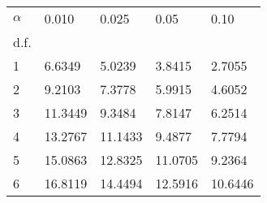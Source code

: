 \documentclass{standalone}
\begin{document}
\begin{tabular}{lllll}
\toprule
$\alpha$ &                       0.010 &                       0.025 &                       0.05 &                       0.10 \\
d.f. &                             &                             &                             &                             \\
\midrule
1    &                      6.6349 &                      5.0239 &                      3.8415 &                      2.7055 \\
2    &   \cellcolor{gray!20}9.2103 &   \cellcolor{gray!20}7.3778 &   \cellcolor{gray!20}5.9915 &   \cellcolor{gray!20}4.6052 \\
3    &                     11.3449 &                      9.3484 &                      7.8147 &                      6.2514 \\
4    &  \cellcolor{gray!20}13.2767 &  \cellcolor{gray!20}11.1433 &   \cellcolor{gray!20}9.4877 &   \cellcolor{gray!20}7.7794 \\
5    &                     15.0863 &                     12.8325 &                     11.0705 &                      9.2364 \\
6    &  \cellcolor{gray!20}16.8119 &  \cellcolor{gray!20}14.4494 &  \cellcolor{gray!20}12.5916 &  \cellcolor{gray!20}10.6446 \\
\bottomrule
\end{tabular}
\end{document}
